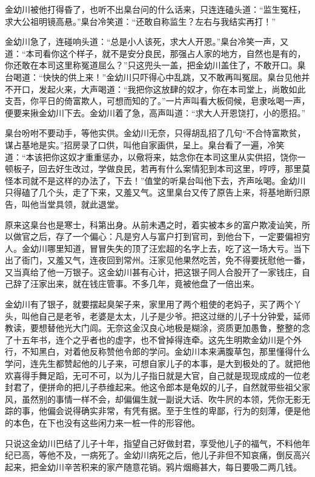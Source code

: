 \documentclass[12pt,UTF8]{ctexbook}
\begin{document}
{{{金幼川被他打得昏了，也听不出臬台问的什么话来，只连连磕头道：“监生冤枉，求大公祖明镜高悬。”臬台冷笑道：“还敢自称监生？左右与我结实再打！”

金幼川急了，连碰响头道：“总是小人该死，求大人开恩。”臬台冷笑一声，又道：“本司看你这个样子，就不是安分良民，那强占人家的地方，自然也是有的，你还敢在本司这里称冤道屈么？”只这兜头一盖，把金幼川盖住了，不敢开口。臬台喝道：“快快的供上来！”金幼川只吓得心中乱跳，又不敢再叫冤屈。臬台见他并不开口，发起火来，大声喝道：“我把你这放肆的奴才，你在本司堂上，尚敢如此支吾，你平日的倚富欺人，可想而知的了。”一片声叫看大板伺候，皂隶吆喝一声，便要来揪金幼川下去。金幼川着了急，高声叫道：“求大人开恩饶打，小的愿招。”

臬台吩咐不要动手，等他实供。金幼川无奈，只得胡乱招了几句“不合恃富欺贫，谋占基地是实。”招房录了口供，叫他自家画供，呈上。臬台看了一遍，冷笑道：“本该把你这奴才重重惩办，以儆将来，姑念你在本司这里从实供招，饶你一顿板子，回去好生改过，学做良民，若再有什么案情犯到本司这里，哼哼，那里莫怪本司就不是这样的办法了，下去！”值堂的听臬台叫他下去，齐声吆喝。金幼川只得磕了几个头，走了下来，又羞又气。这里臬台又传了原告上来，将基地断归原告，叫他当堂具领，就此退堂。

原来这臬台也是寒士，科第出身。从前未遇之时，着实被本乡的富户欺凌讪笑，所以做官之后，存了一个偏心：凡是穷人与富户打到官司，到他台下，一定要偏袒穷人。金幼川哪里知道，冒冒失失的顶了汪宏超的名字上去，吃了这一场大亏。当下出了衙门，又羞又气，连夜回到常州。汪家见他果然吃苦，免不得要抚慰他一番，又当真给了他一万银子。这金幼川甚有心计，把这银子同人合股开了一家钱庄，自己辞了汪家出来，就在钱庄管事。不多几年，竟被他盘了一倍出来。

金幼川有了银子，就要摆起臭架子来，家里用了两个粗使的老妈子，买了两个丫头，叫他自己是老爷，老婆是太太，儿子是少爷。把这过继的儿子十分钟爱，延师教读，要想替他光大门闾。无奈这金汉良心地极是糊涂，资质更加愚鲁，整整的念了十五年书，连个之乎者也的虚字，也不曾掉得连牵。这先生明欺金幼川是个外行，不知黑白，对着他反称赞他令郎的学问。金幼川本来满腹草包，那里懂得什么学问，连先生都赞起他的儿子来，可想自家儿子的本事，是大到极处的了。就把他欢喜得手舞足蹈，无可不可，以为儿子指日就是大官，自己就是现现成成的一位老封君了，便拼命的把儿子恭维起来。他这令郎本是龟奴的儿子，自然就带些祖父家风，虽然别的事情一样不会，却偏偏生就一副说大话、吹牛屄的本领，凭你无影无踪的事，他偏会说得确实非常，有凭有据。至于生性的卑鄙，行为的刻薄，便是他的本色，在下也没有这些闲力来一桩一件的形容他。

只说这金幼川巴结了儿子十年，指望自己好做封君，享受他儿子的福气，不料他年纪已高，等他不及，一病死了。金幼川病死之后，他儿子非但不知哀痛，倒反高兴起来，把金幼川辛苦积来的家产随意花销。鸦片烟瘾甚大，每日要吸二两几钱。

}}}
\end{document}
